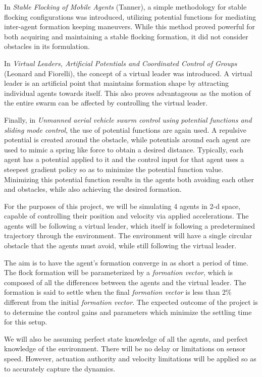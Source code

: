 \documentclass[11pt]{article}
\begin{document}
In \textit{Stable Flocking of Mobile Agents} (Tanner), a simple methodology for stable flocking configurations was introduced, utilizing potential functions for mediating inter-agent formation keeping maneuvers.  While this method proved powerful for both acquiring and maintaining a stable flocking formation, it did not consider obstacles in its formulation.

In \textit{Virtual Leaders, Artificial Potentials and Coordinated Control of Groups} (Leonard and Fiorelli), the concept of a virtual leader was introduced.  A virtual leader is an artificial point that maintains formation shape by attracting individual agents towards itself.  This also proves advantageous as the motion of the entire swarm can be affected by controlling the virtual leader. 

Finally, in \textit{Unmanned aerial vehicle swarm control using potential functions and sliding mode control}, the use of potential functions are again used.  A repulsive potential is created around the obstacle, while potentials around each agent are used to mimic a spring like force to obtain a desired distance.  Typically, each agent has a potential applied to it and the control input for that agent uses a steepest gradient policy so as to minimize the potential function value.  Minimizing this potential function results in the agents both avoiding each other and obstacles, while also achieving the desired formation.

For the purposes of this project, we will be simulating 4 agents in 2-d space, capable of controlling their position and velocity via applied accelerations.  The agents will be following a virtual leader, which itself is following a predetermined trajectory through the environment.  The environment will have a single circular obstacle that the agents must avoid, while still following the virtual leader.

The aim is to have the agent's formation converge in as short a period of time.  The flock formation will be parameterized by a \textit{formation vector}, which is composed of all the differences between the agents and the virtual leader.  The formation is said to settle when the final \textit{formation vector} is less than 2\% different from the initial \textit{formation vector}.  The expected outcome of the project is to determine the control gains and parameters which minimize the settling time for this setup.

We will also be assuming perfect state knowledge of all the agents, and perfect knowledge of the environment.  There will be no delay or limitations on sensor speed.  However, actuation authority and velocity limitations will be applied so as to accurately capture the dynamics.
\end{document}
